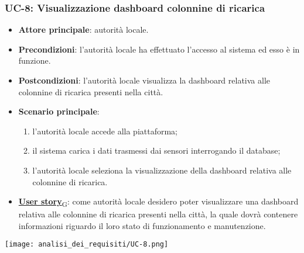 \subsubsection{UC-8: Visualizzazione dashboard colonnine di ricarica}
\begin{itemize}
	\item \textbf{Attore principale}: autorità locale.
	\item \textbf{Precondizioni}: l'autorità locale ha effettuato l'accesso al sistema ed esso è in funzione.
	\item \textbf{Postcondizioni}: l'autorità locale visualizza la dashboard relativa
	      alle colonnine di ricarica presenti nella città.
	\item \textbf{Scenario principale}:
	      \begin{enumerate}
		      \item l'autorità locale accede alla piattaforma;
		      \item il sistema carica i dati trasmessi dai sensori interrogando il database;
		      \item l'autorità locale seleziona la visualizzazione della dashboard relativa alle colonnine di ricarica.
	      \end{enumerate}
	\item \href{https://7last.github.io/docs/rtb/documentazione-interna/glossario\#user-story}{\textbf{User story}\textsubscript{G}}:
	      come autorità locale desidero poter visualizzare una dashboard relativa alle colonnine di ricarica presenti nella città, la quale
	      dovrà contenere informazioni riguardo il loro stato di funzionamento e manutenzione.
\end{itemize}
\begin{center}
	\texttt{[image: analisi\_dei\_requisiti/UC-8.png]}
\end{center}


